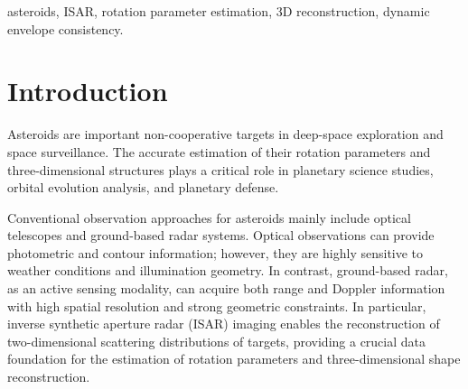 \documentclass[conference]{IEEEtran}
\begin{document}
\begin{abstract}
Accurate estimation of asteroid rotation and three-dimensional (3D) shape is critical for planetary defense, yet it remains challenging due to the geometric coupling between spin and shape and the lack of precise scale priors. This paper proposes a characterization framework featuring dynamic envelope consistency and two-stage dimensionality-reduced optimization. By matching the temporal evolution of Inverse Synthetic Aperture Radar (ISAR) dynamic envelopes and utilizing the Pearson Correlation Coefficient, the rotation dynamics are effectively decoupled from the absolute scale. Subsequently, the high-dimensional reconstruction is simplified into a stable 1D scalar search by constraining vertex displacements along analytical surface normals and incorporating signal-intensity-weighted Laplacian regularization. Computer simulation results validate the effectiveness of the proposed method.
\end{abstract}

\begin{IEEEkeywords}
asteroids, ISAR, rotation parameter estimation, 3D reconstruction, dynamic envelope consistency.
\end{IEEEkeywords}

\section{Introduction}

Asteroids are important non-cooperative targets in deep-space exploration and space surveillance. The accurate estimation of their rotation parameters and three-dimensional structures plays a critical role in planetary science studies, orbital evolution analysis, and planetary defense\cite{ostro2002a}.

Conventional observation approaches for asteroids mainly include optical telescopes and ground-based radar systems. Optical observations can provide photometric and contour information; however, they are highly sensitive to weather conditions and illumination geometry. In contrast, ground-based radar, as an active sensing modality, can acquire both range and Doppler information with high spatial resolution and strong geometric constraints\cite{benner2015}. In particular, inverse synthetic aperture radar (ISAR) imaging enables the reconstruction of two-dimensional scattering distributions of targets, providing a crucial data foundation for the estimation of rotation parameters and three-dimensional shape reconstruction.
\end{document}
